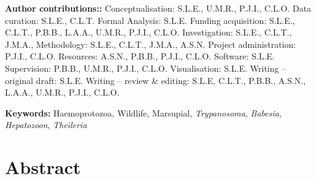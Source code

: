 \documentclass[a4paper, nobind]{templates/ociamthesis}
\begin{document}
\vspace{5mm}

\textbf{Author contributions::}
Conceptualisation: S.L.E., U.M.R., P.J.I., C.L.O.
Data curation: S.L.E., C.L.T.
Formal Analysis: S.L.E.
Funding acquisition: S.L.E., C.L.T., P.B.B., L.A.A., U.M.R., P.J.I., C.L.O.
Investigation: S.L.E., C.L.T., J.M.A.,
Methodology: S.L.E., C.L.T., J.M.A., A.S.N.
Project administration: P.J.I., C.L.O.
Resources: A.S.N., P.B.B., P.J.I., C.L.O.
Software: S.L.E.
Supervision: P.B.B., U.M.R., P.J.I., C.L.O.
Visualisation: S.L.E.
Writing -- original draft: S.L.E.
Writing -- review \& editing: S.L.E, C.L.T., P.B.B., A.S.N., L.A.A., U.M.R., P.J.I., C.L.O.

\vspace{5mm}

\textbf{Keywords:} Haemoprotozoa, Wildlife, Marsupial, \emph{Trypanosoma}, \emph{Babesia}, \emph{Hepatozoon}, \emph{Theileria}

\newpage

\hypertarget{abstract-2}{%
\section{Abstract}\label{abstract-2}}
\end{document}

